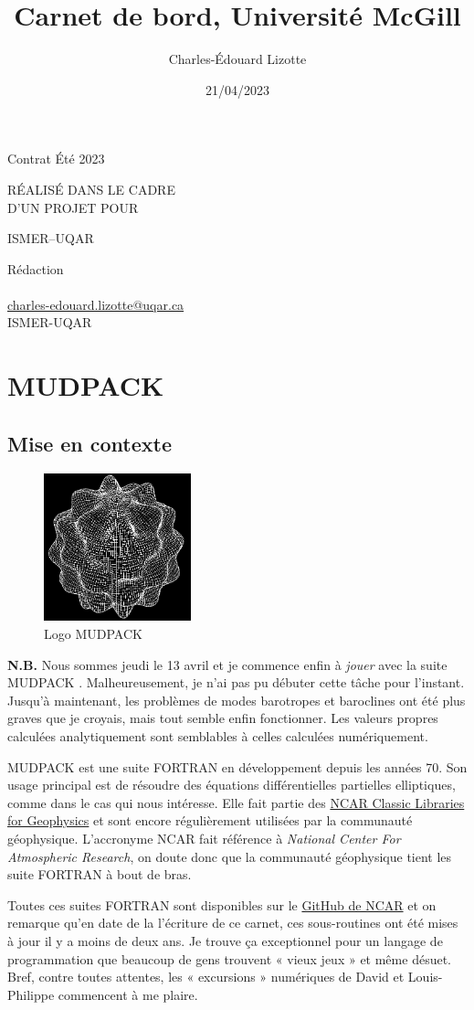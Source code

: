 \documentclass[10pt]{article}
\author{Charles-Édouard Lizotte}
\date{21/04/2023}
\title{Carnet de bord, Université McGill}
\makeatletter
\numberwithin{equation}{section}
\newcommand{\mytitlepage}{
\begin{titlepage}
\begin{center}
{\Large Contrat Été 2023 \par}
\vspace{2cm}
{\Large \MakeUppercase{\thetitle} \par}
\vspace{2cm}
RÉALISÉ DANS LE CADRE\\ D'UN PROJET POUR \par
\vspace{2cm}
{\Large ISMER--UQAR \par}
\vspace{2cm}
{\thedate}
\end{center}
\vfill
Rédaction \\
{\theauthor}\\
\url{charles-edouard.lizotte@uqar.ca}\\
ISMER-UQAR
\end{titlepage}
}
\makeatother
\begin{document}
\mytitlepage
\tableofcontents\newpage


\section{MUDPACK}
\label{sec:org4043a4d}
\subsection{Mise en contexte}
\label{sec:orgea04c87}


\begin{figure} \vspace{-\baselineskip}
\centering
\includegraphics[width=0.38\textwidth]{figures/logos/SPHERE.png}
\caption{\label{fig:org55cbf55}Logo MUDPACK}
\end{figure}

\textbf{N.B.} Nous sommes jeudi le 13 avril et je commence enfin à \emph{jouer} avec la suite MUDPACK   \citep{adams1989mudpack}.
Malheureusement, je n'ai pas pu débuter cette tâche pour l'instant.
Jusqu'à maintenant, les problèmes de modes barotropes et baroclines ont été plus graves que je croyais, mais tout semble enfin fonctionner.
Les valeurs propres calculées analytiquement sont semblables à celles calculées numériquement. \bigskip

MUDPACK \citep{adams1989mudpack} est une suite FORTRAN en développement depuis les années 70.
Son usage principal est de résoudre des équations différentielles partielles elliptiques, comme dans le cas qui nous intéresse.
Elle fait partie des \href{https://arc.ucar.edu/knowledge\_base/71991310}{NCAR Classic Libraries for Geophysics} et sont encore régulièrement utilisées par la communauté géophysique.
L'accronyme NCAR fait référence à \emph{National Center For Atmospheric Research}, on doute donc que la communauté géophysique tient les suite FORTRAN à bout de bras.\bigskip

Toutes ces suites FORTRAN sont disponibles sur le \href{https://github.com/NCAR/NCAR-Classic-Libraries-for-Geophysics}{GitHub de NCAR} et on remarque qu'en date de la l'écriture de ce carnet, ces sous-routines ont été mises à jour il y a moins de deux ans.
Je trouve ça exceptionnel pour un langage de programmation que beaucoup de gens trouvent « vieux jeux » et même désuet.
Bref, contre toutes attentes, les « excursions » numériques de David et Louis-Philippe commencent à me plaire.
\end{document}
